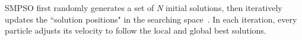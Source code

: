 \documentclass[10pt,journal,compsoc]{IEEEtran}
\newcommand{\Eq}[1]{(\ref{#1})}
\begin{document}
SMPSO first randomly generates a set of \textit{N} initial solutions, then iteratively updates the ``solution positions" in the searching space~\cite{smpso}.
In each iteration, every particle adjusts its velocity to follow the local and global best solutions. 


%
\end{document}
